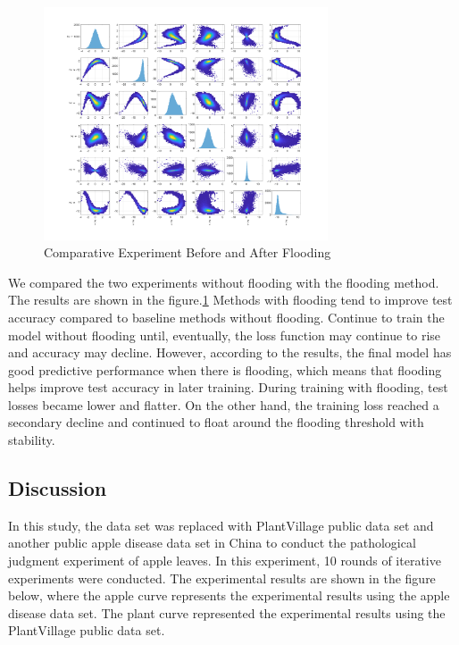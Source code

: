 \documentclass[a4paper,fleqn]{cas-sc}
\begin{document}
\begin{figure}
\centering
\includegraphics[width=0.75\textwidth]{figs/f8.png}
\caption{Comparative Experiment Before and After Flooding}
\label{fig:f78}
\end{figure}

We compared the two experiments without flooding with the flooding method. The results are shown in the figure.\ref{fig:f78} Methods with flooding tend to improve test accuracy compared to baseline methods without flooding. Continue to train the model without flooding until, eventually, the loss function may continue to rise and accuracy may decline. However, according to the results, the final model has good predictive performance when there is flooding, which means that flooding helps improve test accuracy in later training. During training with flooding, test losses became lower and flatter. On the other hand, the training loss reached a secondary decline and continued to float around the flooding threshold with stability.

\subsection{Discussion}
In this study, the data set was replaced with PlantVillage public data set and another public apple disease data set in China to conduct the pathological judgment experiment of apple leaves. In this experiment, 10 rounds of iterative experiments were conducted. The experimental results are shown in the figure below, where the apple curve represents the experimental results using the apple disease data set. The plant curve represented the experimental results using the PlantVillage public data set. 
\end{document}
